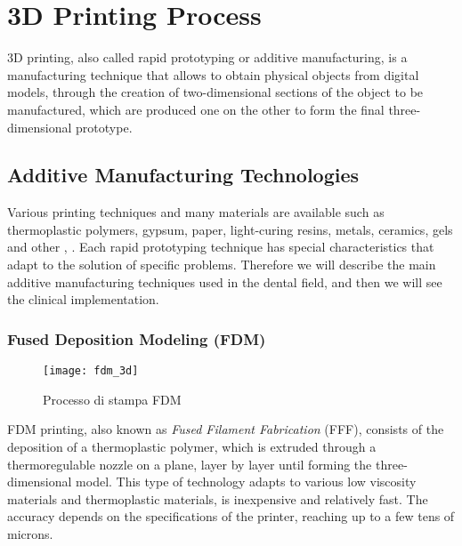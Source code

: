 
\chapter{3D Printing Process} %

\label{Chapter5} %


3D printing, also called rapid prototyping or additive manufacturing, is a manufacturing technique that allows to obtain physical objects from digital models, through the creation of two-dimensional sections of the object to be manufactured, which are produced one on the other to form the final three-dimensional prototype.

\section{Additive Manufacturing Technologies}
Various printing techniques and many materials are available such as thermoplastic polymers, gypsum, paper, light-curing resins, metals, ceramics, gels and other \parencite{Reference119}, \parencite{Reference120}. Each rapid prototyping technique has special characteristics that adapt to the solution of specific problems. Therefore we will describe the main additive manufacturing techniques used in the dental field, and then we will see the clinical implementation.

\subsection{Fused Deposition Modeling (FDM)}
\begin{wrapfigure} {R} {0.4\textwidth}
\vspace{-40pt}
	\begin{center}
	\texttt{[image: fdm\_3d]}
    \caption{Processo di stampa FDM}
    \label{fig:fdm_3d}
	\end{center}
\vspace{-40pt}
\end{wrapfigure}
FDM printing, also known as \emph{Fused Filament Fabrication} (FFF), consists of the deposition of a thermoplastic polymer, which is extruded through a thermoregulable nozzle on a plane, layer by layer until forming the three-dimensional model. This type of technology adapts to various low viscosity materials and thermoplastic materials, is inexpensive and relatively fast. The accuracy depends on the specifications of the printer, reaching up to a few tens of microns.
\pagebreak
